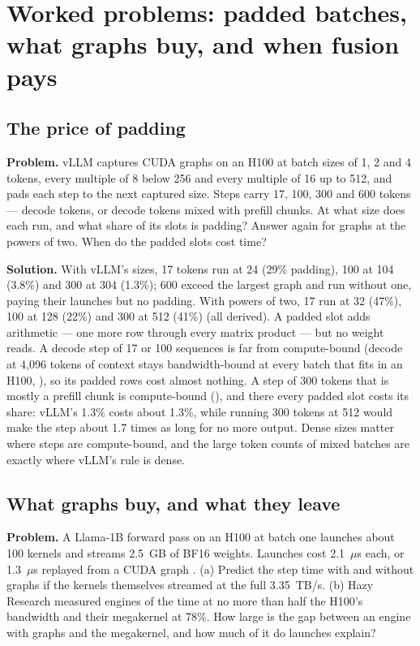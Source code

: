 \section{Worked problems: padded batches, what graphs buy, and when fusion pays}

\subsection{The price of padding}
\textbf{Problem.} vLLM captures CUDA graphs on an H100 at batch sizes of 1, 2
and 4 tokens, every multiple of 8 below 256 and every multiple of 16 up to 512,
and pads each step to the next captured size. Steps carry 17, 100, 300 and 600
tokens --- decode tokens, or decode tokens mixed with prefill chunks. At what
size does each run, and what share of its slots is padding? Answer again for
graphs at the powers of two. When do the padded slots cost time?

\textbf{Solution.} With vLLM's sizes, 17 tokens run at 24 (29\% padding), 100
at 104 (3.8\%) and 300 at 304 (1.3\%); 600 exceed the largest graph and run
without one, paying their launches but no padding. With powers of two, 17 run
at 32 (47\%), 100 at 128 (22\%) and 300 at 512 (41\%) (all derived). A padded
slot adds arithmetic --- one more row through every matrix product --- but no
weight reads. A decode step of 17 or 100 sequences is far from compute-bound
(decode at 4,096 tokens of context stays bandwidth-bound at every batch that
fits in an H100, ), so its padded rows cost almost nothing.
A step of 300 tokens that is mostly a prefill chunk is compute-bound
(), and there every padded slot costs its share: vLLM's
1.3\% costs about 1.3\%, while running 300 tokens at 512 would make the step
about 1.7 times as long for no more output. Dense sizes matter where steps are
compute-bound, and the large token counts of mixed batches are exactly where
vLLM's rule is dense.

\subsection{What graphs buy, and what they leave}
\textbf{Problem.} A Llama-1B forward pass on an H100 at batch one launches
about 100 kernels and streams 2.5~GB of BF16 weights. Launches cost
2.1~$\mu$s each, or 1.3~$\mu$s replayed from a CUDA graph
\cite{spector2025megakernel}. (a) Predict the step time with and without
graphs if the kernels themselves streamed at the full 3.35~TB/s. (b) Hazy
Research measured engines of the time at no more than half the H100's
bandwidth and their megakernel at 78\%. How large is the gap between an engine
with graphs and the megakernel, and how much of it do launches explain?

